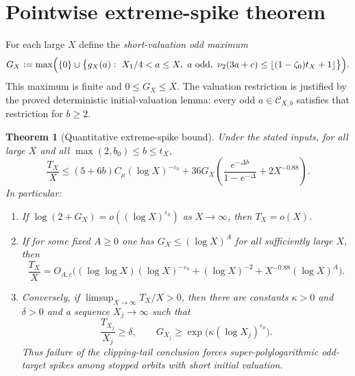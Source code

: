 \documentclass[11pt,a4paper]{article}
\newtheorem{theorem}{Theorem}
\begin{document}
\section{Pointwise extreme-spike theorem}
For each large $X$ define the \emph{short-valuation odd maximum}
\[
 G_X:=\max\Bigl(\{0\}\cup
 \bigl\{g_X(a):\ X_1/4<a\le X,\ a\text{ odd},\
 \nu_2(3a+c)\le\lfloor(1-\zeta_0)t_X+1\rfloor\bigr\}\Bigr).
\]
This maximum is finite and $0\le G_X\le X$. The valuation restriction
is justified by the proved deterministic initial-valuation lemma:
every odd $a\in\mathcal C_{X,b}$ satisfies that restriction for $b\ge2$.

\begin{theorem}[Quantitative extreme-spike bound]\label{thm:main}
Under the stated inputs, for all large $X$ and all
$\max(2,b_0)\le b\le t_X$,
\begin{equation}\label{eq:main}
 \boxed{\quad
 \frac{T_X}{X}\le
 (5+6b)C_\mu(\log X)^{-\varepsilon_0}
 +36G_X\left(\frac{e^{-\Delta b}}{1-e^{-\Delta}}
 +2X^{-0.88}\right).\quad}
\end{equation}
In particular:
\begin{enumerate}
\item If $\log(2+G_X)=o((\log X)^{\varepsilon_0})$ as
$X\to\infty$, then $T_X=o(X)$.
\item If for some fixed $A\ge0$ one has
$G_X\le(\log X)^A$ for all sufficiently large $X$, then
\begin{equation}\label{eq:polylog}
 \frac{T_X}{X}
 =O_{A,c}\bigl((\log\log X)(\log X)^{-\varepsilon_0}
 +(\log X)^{-2}+X^{-0.88}(\log X)^A\bigr).
\end{equation}
\item Conversely, if $\limsup_{X\to\infty}T_X/X>0$, then
there are constants $\kappa>0$ and $\delta>0$ and a sequence
$X_j\to\infty$ such that
\begin{equation}\label{eq:spike}
 \frac{T_{X_j}}{X_j}\ge\delta,
 \qquad
 G_{X_j}\ge\exp\bigl(\kappa(\log X_j)^{\varepsilon_0}\bigr).
\end{equation}
Thus failure of the clipping-tail conclusion forces
super-polylogarithmic odd-target spikes \emph{among stopped
orbits with short initial valuation}.
\end{enumerate}
\end{theorem}
\end{document}
